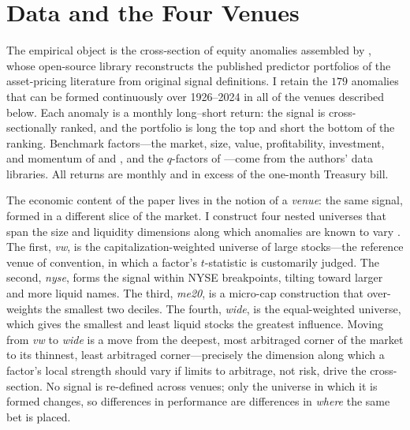 \documentclass[12pt]{article}
\theoremstyle{plain}
\theoremstyle{definition}
\begin{document}
\section{Data and the Four Venues}
\label{sec:data}

The empirical object is the cross-section of equity anomalies assembled by
\citet{ChenZimmermann2022}, whose open-source library reconstructs the published
predictor portfolios of the asset-pricing literature from original signal
definitions. I retain the $179$ anomalies that can be formed continuously over
1926--2024 in all of the venues described below. Each anomaly is a monthly
long--short return: the signal is cross-sectionally ranked, and the portfolio is
long the top and short the bottom of the ranking. Benchmark factors---the
market, size, value, profitability, investment, and momentum of
\citet{FamaFrench2015} and \citet{Carhart1997}, and the $q$-factors of
\citet{HouXueZhang2015}---come from the authors' data libraries. All returns are
monthly and in excess of the one-month Treasury bill.

The economic content of the paper lives in the notion of a \emph{venue}: the
same signal, formed in a different slice of the market. I construct four nested
universes that span the size and liquidity dimensions along which anomalies are
known to vary \citep{FamaFrench2008,IsraelMoskowitz2013}. The first,
\emph{vw}, is the capitalization-weighted universe of large stocks---the
reference venue of convention, in which a factor's $t$-statistic is customarily
judged. The second, \emph{nyse}, forms the signal within NYSE breakpoints,
tilting toward larger and more liquid names. The third, \emph{me20}, is a
micro-cap construction that over-weights the smallest two deciles. The fourth,
\emph{wide}, is the equal-weighted universe, which gives the smallest and least
liquid stocks the greatest influence. Moving from \emph{vw} to \emph{wide} is a
move from the deepest, most arbitraged corner of the market to its thinnest,
least arbitraged corner---precisely the dimension along which a factor's local
strength should vary if limits to arbitrage, not risk, drive the cross-section.
No signal is re-defined across venues; only the universe in which it is formed
changes, so differences in performance are differences in \emph{where} the same
bet is placed.
\end{document}
